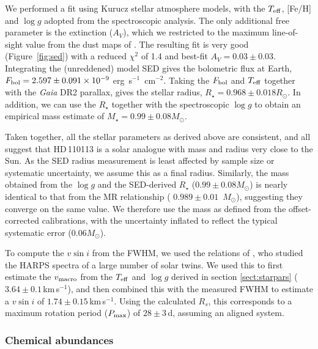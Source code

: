 \documentclass[fleqn,usenatbib]{mnras}
\newcommand{\harps}{{HARPS}}
\newcommand{\kms}{km\,s$^{-1}$}
\newcommand{\rstar}{\mbox{$R_{\star}$}}
\newcommand{\msun}{\mbox{$M_{\odot}$}}
\newcommand{\vsini}{$v\sin{i}$}
\newcommand{\teff}{$T_{\rm eff}$}
\newcommand{\feh}{\mbox{$\rm [Fe/H]$}}
\newcommand{\logg}{$\log g$}
\newcommand{\Tmstartorres}{ $ 0.989 \pm 0.01 $ }
\newcommand{\Tstar}{HD\,110113}
\begin{document}
We performed a fit using Kurucz stellar atmosphere models, with the $T_{\rm eff}$, [Fe/H] and $\log g$ adopted from the spectroscopic analysis. The only additional free parameter is the extinction ($A_V$), which we restricted to the maximum line-of-sight value from the dust maps of \citet{Schlegel:1998}. The resulting fit is very good (Figure~\ref{fig:sed}) with a reduced $\chi^2$ of 1.4 and best-fit $A_V = 0.03 \pm 0.03$. Integrating the (unreddened) model SED gives the bolometric flux at Earth, $F_{\rm bol} = 2.597 \pm 0.091 \times 10^{-9}$ erg~s$^{-1}$~cm$^{-2}$. Taking the $F_{\rm bol}$ and $T_{\rm eff}$ together with the {\it Gaia\/} DR2 parallax, gives the stellar radius, $R_\star = 0.968 \pm 0.018 R_\odot$. In addition, we can use the $R_\star$ together with the spectroscopic $\log g$ to obtain an empirical mass estimate of $M_\star = 0.99 \pm 0.08 M_\odot$.

Taken together, all the stellar parameters as derived above are consistent, and all suggest that \Tstar{} is a solar analogue with mass and radius very close to the Sun.
As the SED radius measurement is least affected by sample size or systematic uncertainty, we assume this as a final radius.
Similarly, the mass obtained from the \logg{} and the SED-derived \rstar{} ($0.99 \pm 0.08 M_\odot$) is nearly identical to that from the MR relationship (\Tmstartorres{}\,\msun{}), suggesting they converge on the same value.
We therefore use the mass as defined from the offset-corrected \citet{2010A&ARv..18...67T} calibrations, with the uncertainty inflated to reflect the typical systematic error ($0.06M_{\odot}$).

To compute the \vsini{} from the FWHM, we used the relations of \citet{dos2016solar}, who studied the \harps{} spectra of a large number of solar twins.
We used this to first estimate the $v_{\rm macro}$ from the \teff{} and \logg{} derived in section \ref{sect:starpars} ($3.64\pm0.1$\,\kms{}), and then combined this with the measured FWHM to estimate a \vsini{} of $1.74\pm0.15$\,\kms{}.
Using the calculated $R_s$, this corresponds to a maximum rotation period ($P_{\rm max}$) of $28\pm3$\,d, assuming an aligned system.

\subsubsection{Chemical abundances} \label{sect:abunds}
\end{document}
